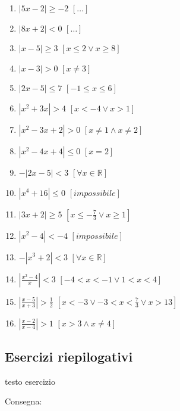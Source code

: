 \begin{enumerate}
\item $\left| 5x-2\right| \geq -2 $ \hfill $\left[ \dots \right] $
\item $\left| 8x+2\right| < 0 $ \hfill $\left[ \dots \right] $
\item $\left| x-5\right| \geq 3 $ \hfill $\left[ x\leq 2 \vee x\geq 8 \right] $
\item $\left| x-3\right| >0 $ \hfill $\left[ x\neq 3 \right] $
\item $\left| 2x-5\right| \leq 7 $ \hfill $\left[ -1\leq x \leq 6 \right] $
\item $\left| x^2+3x\right| >4 $ \hfill $\left[ x<-4 \vee x>1 \right] $
\item $\left| x^2-3x+2\right| >0 $ \hfill $\left[ x\neq 1 \wedge x\neq 2 \right] 
$
\item $\left| x^2-4x+4\right| \leq 0 $ \hfill $\left[ x=2 \right] $
\item $-\left| 2x-5\right| <3 $ \hfill $\left[ \forall x \in \mathbb{R} \right] 
$
\item $\left| x^4+16\right| \leq 0 $ \hfill $\left[ impossibile \right] $
\item $\left| 3x+2\right| \geq 5 $ \hfill $\left[ x\leq -\frac{7}{3} \vee x\geq 
1 \right] $
\item $\left| x^2-4\right| <-4 $ \hfill $\left[ impossibile \right] $
\item $-\left| x^3+2\right| <3 $ \hfill $\left[ \forall x \in \mathbb{R} \right] 
$
\item $\left| \frac{x^2-4}{x}\right| <3 $ \hfill $\left[ -4<x<-1 \vee 1<x<4 
\right] $
\item $\left| \frac{x-5}{x+3}\right| >\frac{1}{2} $ \hfill $\left[x<-3 \vee 
-3<x<\frac{7}{3} \vee x>13 \right] $
\item $\left| \frac{x-2}{x-4}\right| >1 $ \hfill $\left[x>3 \wedge x \neq 4 
\right] $
\end{enumerate}








\subsection{Esercizi riepilogativi}

\begin{esercizio}
\label{ese:D.19}
testo esercizio
\end{esercizio}

\begin{esercizio}\label{ese:03.1}
Consegna:
 \begin{enumeratea}
  \item  
 \end{enumeratea}
\end{esercizio}
